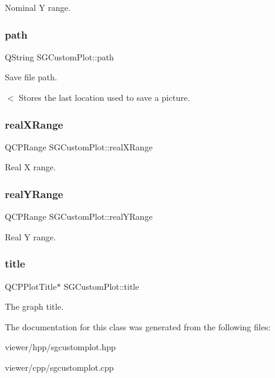 Nominal Y range. \mbox{\label{classSGCustomPlot_a9051f043c91f3e59fbc1c2a818c76687}} 
\subsubsection{\texorpdfstring{path}{path}}
{\footnotesize\ttfamily Q\+String S\+G\+Custom\+Plot\+::path\hspace{0.3cm}{\ttfamily [private]}}



Save file path. 

$<$ Stores the last location used to save a picture. \mbox{\label{classSGCustomPlot_a96f63b86fe49372586cb6be908d88bc4}} 
\subsubsection{\texorpdfstring{real\+X\+Range}{realXRange}}
{\footnotesize\ttfamily Q\+C\+P\+Range S\+G\+Custom\+Plot\+::real\+X\+Range\hspace{0.3cm}{\ttfamily [private]}}

Real X range. \mbox{\label{classSGCustomPlot_aeffca93d0d63a439e3c3bf35d18fa698}} 
\subsubsection{\texorpdfstring{real\+Y\+Range}{realYRange}}
{\footnotesize\ttfamily Q\+C\+P\+Range S\+G\+Custom\+Plot\+::real\+Y\+Range\hspace{0.3cm}{\ttfamily [private]}}

Real Y range. \mbox{\label{classSGCustomPlot_a230237a7692e75bfe15e250342bfd801}} 
\subsubsection{\texorpdfstring{title}{title}}
{\footnotesize\ttfamily Q\+C\+P\+Plot\+Title$\ast$ S\+G\+Custom\+Plot\+::title\hspace{0.3cm}{\ttfamily [private]}}

The graph title. 

The documentation for this class was generated from the following files\+:\begin{DoxyCompactItemize}
\item 
viewer/hpp/sgcustomplot.\+hpp\item 
viewer/cpp/sgcustomplot.\+cpp\end{DoxyCompactItemize}

